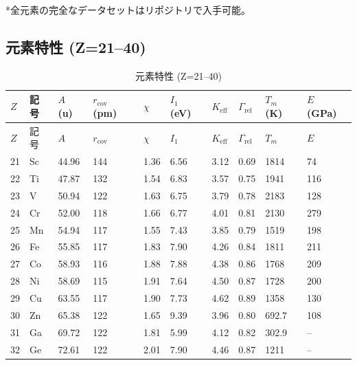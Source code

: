 \documentclass[11pt,a4paper]{article}
\newcommand{\Keff}{K_{\mathrm{eff}}}
\theoremstyle{remark}
\begin{document}
	\vspace{0.2cm}
	*全元素の完全なデータセットはリポジトリで入手可能。
	
	\subsection*{元素特性 (Z=21–40)}
	
	\begin{longtable}{p{0.6cm}p{1.2cm}p{1.2cm}p{1.2cm}p{1.2cm}p{1.2cm}p{1.5cm}p{1.2cm}p{1.2cm}p{1.2cm}}
		\caption{元素特性 (Z=21–40)} \label{tab:elem-data-21to40} \\
		\toprule
		\(Z\) & 記号 & \(A\) (u) & \(r_{\text{cov}}\) (pm) & \(\chi\) & \(I_1\) (eV) & \(\Keff\) & \(\Gamma_{\text{rel}}\) & \(T_m\) (K) & \(E\) (GPa) \\
		\midrule
		\endfirsthead
		\toprule
		\(Z\) & 記号 & \(A\) & \(r_{\text{cov}}\) & \(\chi\) & \(I_1\) & \(\Keff\) & \(\Gamma_{\text{rel}}\) & \(T_m\) & \(E\) \\
		\midrule
		\endhead
		21 & Sc & 44.96 & 144 & 1.36 & 6.56 & 3.12 & 0.69 & 1814 & 74 \\
		22 & Ti & 47.87 & 132 & 1.54 & 6.83 & 3.57 & 0.75 & 1941 & 116 \\
		23 & V  & 50.94 & 122 & 1.63 & 6.75 & 3.79 & 0.78 & 2183 & 128 \\
		24 & Cr & 52.00 & 118 & 1.66 & 6.77 & 4.01 & 0.81 & 2130 & 279 \\
		25 & Mn & 54.94 & 117 & 1.55 & 7.43 & 3.85 & 0.79 & 1519 & 198 \\
		26 & Fe & 55.85 & 117 & 1.83 & 7.90 & 4.26 & 0.84 & 1811 & 211 \\
		27 & Co & 58.93 & 116 & 1.88 & 7.88 & 4.38 & 0.86 & 1768 & 209 \\
		28 & Ni & 58.69 & 115 & 1.91 & 7.64 & 4.50 & 0.87 & 1728 & 200 \\
		29 & Cu & 63.55 & 117 & 1.90 & 7.73 & 4.62 & 0.89 & 1358 & 130 \\
		30 & Zn & 65.38 & 122 & 1.65 & 9.39 & 3.96 & 0.80 & 692.7 & 108 \\
		31 & Ga & 69.72 & 122 & 1.81 & 5.99 & 4.12 & 0.82 & 302.9 & – \\
		32 & Ge & 72.61 & 122 & 2.01 & 7.90 & 4.46 & 0.87 & 1211 & – \\

\end{longtable}
\end{document}
